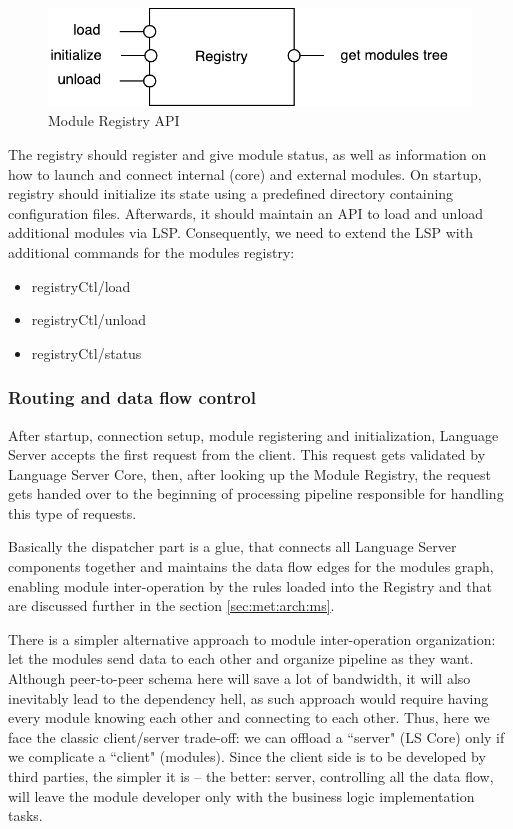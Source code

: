 \begin{figure}[H]
    \centering
    \includegraphics[width=.7\textwidth]{figs/registry.pdf}
    \caption{Module Registry API}
\end{figure}

\newpage
The registry should register and give module status, as well as information on how to launch and connect
internal (core) and external modules. On startup, registry should initialize its state using a predefined directory
containing configuration files. Afterwards, it should maintain an API to load and unload additional modules via LSP.
Consequently, we need to extend the LSP with additional commands for the modules registry:

\begin{itemize}
    \item registryCtl/load
    \item registryCtl/unload
    \item registryCtl/status
\end{itemize}

\subsubsection{Routing and data flow control}
\label{sec:met:arch:core:dispatcher}

After startup, connection setup, module registering and initialization, 
Language Server accepts the first request from the client. 
This request gets validated by Language Server Core, then, after looking up the Module Registry, the request 
gets handed over to the beginning of processing pipeline responsible for handling this type of requests.

Basically the dispatcher part is a glue, that connects all Language Server components together and 
maintains the data flow edges for the modules graph, enabling module inter-operation by the
rules loaded into the Registry and that are discussed further in the section \ref{sec:met:arch:ms}.

There is a simpler alternative approach to module inter-operation organization: let the modules send data 
to each other and organize pipeline as they want. Although peer-to-peer schema here will save a lot of bandwidth, 
it will also inevitably lead to the dependency hell, 
as such approach would require having every module knowing each other and connecting to each other. 
Thus, here we face the classic client/server trade-off: we can offload a ``server" (LS Core) only
if we complicate a ``client" (modules). 
Since the client side is to be developed by third parties, the simpler it is -- the better: 
server, controlling all the data flow, will leave the module developer only with the business logic implementation tasks. 

